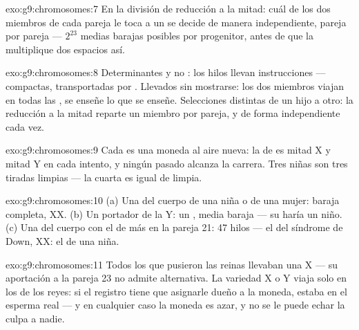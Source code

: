 \begin{solution}{exo:g9:chromosomes:7}
En la división de reducción a la mitad: cuál de los dos miembros de
cada pareja le toca a un  se decide de manera independiente,
pareja por pareja --- $2^{23}$ medias barajas posibles por progenitor,
antes de que la  multiplique dos espacios así.
\end{solution}

\begin{solution}{exo:g9:chromosomes:8}
Determinantes y no : los hilos llevan instrucciones ---
compactas, transportadas por . Llevados sin mostrarse: los dos
miembros viajan en todas las , se enseñe lo que se enseñe.
Selecciones distintas de un hijo a otro: la reducción a la mitad
reparte un miembro por pareja, y de forma independiente cada vez.
\end{solution}

\begin{solution}{exo:g9:chromosomes:9}
Cada  es una moneda al aire nueva: la  de
 es mitad X y mitad Y en cada intento, y ningún
 pasado alcanza la carrera. Tres niñas son tres tiradas
limpias --- la cuarta es igual de limpia.
\end{solution}

\begin{solution}{exo:g9:chromosomes:10}
(a) Una  del cuerpo de una niña o de una mujer: baraja completa,
XX. (b) Un  portador de la Y: un , media baraja ---
su  haría un niño. (c) Una  del cuerpo con el de más
en la pareja 21: 47 hilos --- el  del síndrome de Down, XX: el
de una niña.
\end{solution}

\begin{solution}{exo:g9:chromosomes:11}
Todos los  que pusieron las reinas llevaban una X --- su
aportación a la pareja 23 no admite alternativa. La variedad X o Y
viaja solo en los  de los reyes: si el registro tiene que
asignarle dueño a la moneda, estaba en el esperma real --- y en
cualquier caso la moneda es azar, y no se le puede echar la culpa a
nadie.
\end{solution}

